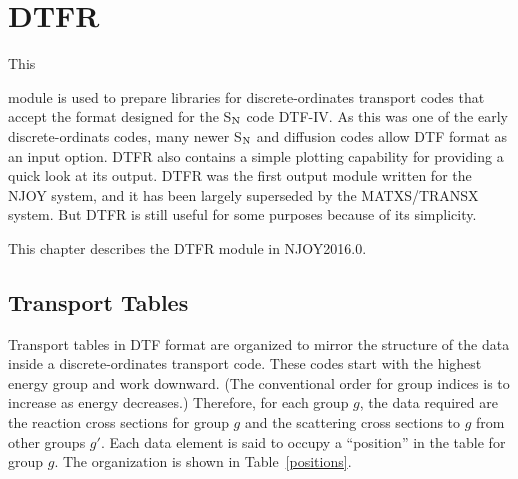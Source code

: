 \section{DTFR}
\label{sDTFR}

\hypertarget{sDTFRhy}{This}
module is used to prepare libraries for discrete-ordinates
transport codes that accept the format designed for the S$_{\rm N}$ code
DTF-IV\cite{DTF}.  As this was one of the early discrete-ordinats
codes, many newer S$_{\rm N}$ and
diffusion codes allow DTF format as an input option.  DTFR also
contains a simple plotting capability for providing a quick look
at its output.  DTFR was the first output module written for the
NJOY system, and it has been largely superseded by the MATXS/TRANSX
 system.  But DTFR is still useful for some purposes
because of its simplicity.

This chapter describes the DTFR module in NJOY2016.0.

\subsection{Transport Tables}
\label{ssTTables}

Transport tables in DTF format are organized to
mirror the structure of the data inside a discrete-ordinates transport code.
  These codes start with the highest
energy group and work downward.  (The conventional order for group indices
is to increase as energy decreases.)  Therefore, for each group $g$, the
data required are the reaction cross sections for group $g$ and the
scattering cross sections to $g$ from other groups $g'$.  Each data element
is said to occupy a ``position'' in the table for group $g$. The
organization is shown in Table~\ref{positions}.

